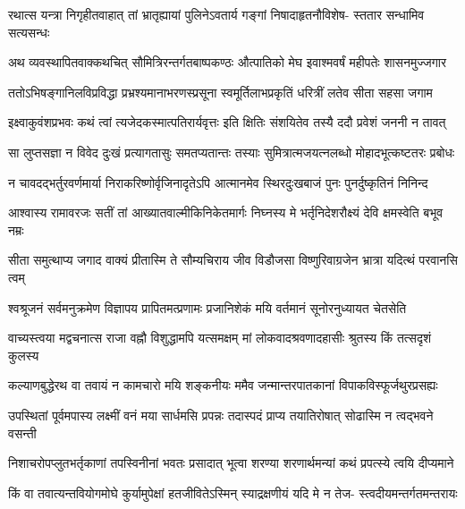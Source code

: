 \fourlineindentedshloka
{रथात्स यन्त्रा निगृहीतवाहात्}
{तां भ्रातृह्यायां पुलिनेऽवतार्य}
{गङ्गां निषादाहृतनौविशेष-}
{स्ततार सन्धामिव सत्यसन्धः} %

\fourlineindentedshloka
{अथ व्यवस्थापितवाक्कथचित्}
{सौमित्रिरन्तर्गतबाष्पकण्ठः}
{औत्पातिको मेघ इवाश्मवर्षं}
{महीपतेः शासनमुज्जगार} %

\fourlineindentedshloka
{ततोऽभिषङ्गानिलविप्रविद्धा}
{प्रभ्रश्यमानाभरणस्प्रसूना}
{स्वमूर्तिलाभप्रकृतिं धरित्रीं}
{लतेव सीता सहसा जगाम} %

\twolineshloka
{इक्ष्वाकुवंशप्रभवः कथं त्वां त्यजेदकस्मात्पतिरार्यवृत्तः}
{इति क्षितिः संशयितेव तस्यै ददौ प्रवेशं जननी न तावत्} %

\fourlineindentedshloka
{सा लुप्तसज्ञा न विवेद दुःखं}
{प्रत्यागतासुः समतप्यतान्तः}
{तस्याः सुमित्रात्मजयत्नलब्धो}
{मोहादभूत्कष्टतरः प्रबोधः} %

\fourlineindentedshloka
{न चावदद्भर्तुरवर्णमार्या}
{निराकरिष्णोर्वृजिनादृतेऽपि}
{आत्मानमेव स्थिरदुःखबाजं}
{पुनः पुनर्दुष्कृतिनं निनिन्द} %

\fourlineindentedshloka
{आश्वास्य रामावरजः सतीं तां}
{आख्यातवाल्मीकिनिकेतमार्गः}
{निघ्नस्य मे भर्तृनिदेशरौक्ष्यं}
{देवि क्षमस्वेति बभूव नम्रः} %

\fourlineindentedshloka
{सीता समुत्थाप्य जगाद वाक्यं}
{प्रीतास्मि ते सौम्यचिराय जीव}
{विडौजसा विष्णुरिवाग्रजेन}
{भ्रात्रा यदित्थं परवानसि त्वम्} %

\fourlineindentedshloka
{श्वश्रूजनं सर्वमनुक्रमेण}
{विज्ञापय प्रापितमत्प्रणामः}
{प्रजानिशेकं मयि वर्तमानं}
{सूनोरनुध्यायत चेतसेति} %

\fourlineindentedshloka
{वाच्यस्त्वया मद्वचनात्स राजा}
{वह्नौ विशुद्धामपि यत्समक्षम्}
{मां लोकवादश्रवणादहासीः}
{श्रुतस्य किं तत्सदृशं कुलस्य} %

\fourlineindentedshloka
{कल्याणबुद्धेरथ वा तवायं}
{न कामचारो मयि शङ्कनीयः}
{ममैव जन्मान्तरपातकानां}
{विपाकविस्फूर्जथुरप्रसह्यः} %

\fourlineindentedshloka
{उपस्थितां पूर्वमपास्य लक्ष्मीं}
{वनं मया सार्धमसि प्रपन्नः}
{तदास्पदं प्राप्य तयातिरोषात्}
{सोढास्मि न त्वद्भवने वसन्ती} %

\twolineshloka
{निशाचरोपप्लुतभर्तृकाणां तपस्विनीनां भवतः प्रसादात्}
{भूत्वा शरण्या शरणार्थमन्यां कथं प्रपत्स्ये त्वयि दीप्यमाने} %

\fourlineindentedshloka
{किं वा तवात्यन्तवियोगमोघे}
{कुर्यामुपेक्षां हतजीवितेऽस्मिन्}
{स्याद्रक्षणीयं यदि मे न तेज-}
{स्त्वदीयमन्तर्गतमन्तरायः} %

